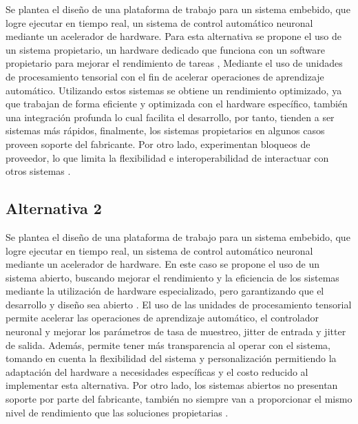 \documentclass[12pt]{article}
\begin{document}
Se plantea el diseño de una plataforma de trabajo para un sistema embebido, que logre ejecutar en tiempo real, un sistema de control automático neuronal mediante un acelerador de hardware. Para esta alternativa se propone el uso de un sistema propietario, un hardware dedicado que funciona con un software propietario para mejorar el rendimiento de tareas\cite{zhao2017hardware} \cite{shi2011vcuda}, Mediante el uso de unidades de procesamiento tensorial con el fin de acelerar operaciones de aprendizaje automático. Utilizando estos sistemas se obtiene un rendimiento optimizado, ya que trabajan de forma eficiente y optimizada con el hardware específico, también una integración profunda lo cual facilita el desarrollo, por tanto, tienden a ser sistemas más rápidos, finalmente, los sistemas propietarios en algunos casos proveen soporte del fabricante. Por otro lado, experimentan bloqueos de proveedor, lo que limita la flexibilidad e interoperabilidad de interactuar con otros sistemas \cite{deng2020model} \cite{duato2011enabling}.

\subsection{Alternativa 2}

Se plantea el diseño de una plataforma de trabajo para un sistema embebido, que logre ejecutar en tiempo real, un sistema de control automático neuronal mediante un acelerador de hardware. En este caso se propone el uso de un sistema abierto, buscando mejorar el rendimiento y la eficiencia de los sistemas mediante la utilización de hardware especializado, pero garantizando que el desarrollo y diseño sea abierto \cite{scarpino2011opencl} \cite{owaida2011massively}. El uso de las unidades de procesamiento tensorial permite acelerar las operaciones de aprendizaje automático, el controlador neuronal y mejorar los parámetros de tasa de muestreo, jitter de entrada y jitter de salida. Además, permite tener más transparencia al operar con el sistema, tomando en cuenta la flexibilidad del sistema y personalización permitiendo la adaptación del hardware a necesidades específicas y el costo reducido al implementar esta alternativa. Por otro lado, los sistemas abiertos no presentan soporte por parte del fabricante, también no siempre van a proporcionar el mismo nivel de rendimiento que las soluciones propietarias \cite{meyer2020evaluating} \cite{verma2016accelerating}.
\end{document}
